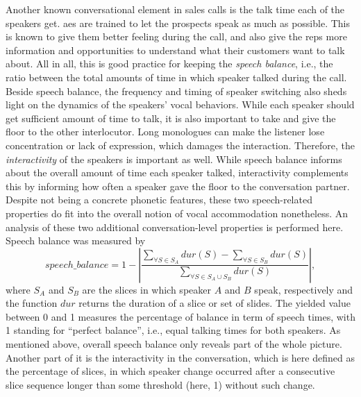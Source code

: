 %
Another known conversational element in sales calls is the talk time each of the speakers get.
\Acp{ae} are trained to let the prospects speak as much as possible.
This is known to give them better feeling during the call, and also give the reps more information and opportunities to understand what their customers want to talk about.
All in all, this is good practice for keeping the \emph{speech balance}, i.e., the ratio between the total amounts of time in which speaker talked during the call.
Beside speech balance, the frequency and timing of speaker switching also sheds light on the dynamics of the speakers' vocal behaviors.
While each speaker should get sufficient amount of time to talk, it is also important to take and give the floor to the other interlocutor.
Long monologues can make the listener lose concentration or lack of expression, which damages the interaction.
Therefore, the \emph{interactivity} of the speakers is important as well.
While speech balance informs about the overall amount of time each speaker talked, interactivity complements this by informing how often a speaker gave the floor to the conversation partner.
Despite not being a concrete phonetic features, these two speech-related properties do fit into the overall notion of vocal accommodation nonetheless.
An analysis of these two additional conversation-level properties is performed here.
Speech balance was measured by
%
\begin{equation}
	\label{eq:speech_balance}
	speech\_balance = 
	1 - \left| \frac{\displaystyle \sum_{\forall S \in S_A} dur(S) - 
						\sum_{\forall S \in S_B} dur(S)}
					{\displaystyle \sum_{\forall S \in S_A \cup S_B} dur(S)}
		\right|,
\end{equation}
\noindent
%
where $S_A$ and $S_B$ are the slices in which speaker $A$ and $B$ speak, respectively and the function $dur$ returns the duration of a slice or set of slides.
The yielded value between 0 and 1 measures the percentage of balance in term of speech times, with 1 standing for \enquote{perfect balance}, i.e., equal talking times for both speakers.
As mentioned above, overall speech balance only reveals part of the whole picture.
Another part of it is the interactivity in the conversation, which is here defined as
%
%
the percentage of slices, in which speaker change occurred after a consecutive slice sequence longer than some threshold (here, 1) without such change.

